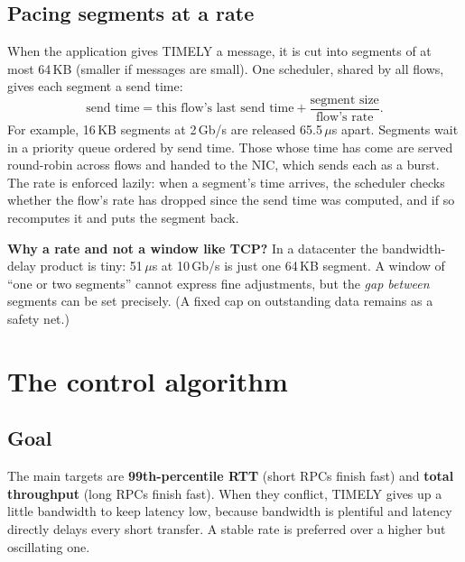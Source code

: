 \subsection{Pacing segments at a rate}
When the application gives TIMELY a message, it is cut into segments of at most 64\,KB (smaller if messages are small). One scheduler, shared by
all flows, gives each segment a send time:
\[
  \text{send time} = \text{this flow's last send time} + \frac{\text{segment size}}{\text{flow's rate}}.
\]
For example, 16\,KB segments at 2\,Gb/s are released 65.5\,$\mu$s apart. Segments wait in a priority queue ordered by send time. Those whose
time has come are served round-robin across flows and handed to the NIC, which sends each as a burst. The rate is enforced lazily: when a
segment's time arrives, the scheduler checks whether the flow's rate has dropped since the send time was computed, and if so recomputes it and
puts the segment back.

\textbf{Why a rate and not a window like TCP?} In a datacenter the bandwidth-delay product is tiny: 51\,$\mu$s at 10\,Gb/s is just one 64\,KB
segment. A window of ``one or two segments'' cannot express fine adjustments, but the \emph{gap between} segments can be set precisely. (A
fixed cap on outstanding data remains as a safety net.)

\section{The control algorithm}

\subsection{Goal}
The main targets are \textbf{99th-percentile RTT} (short RPCs finish fast) and \textbf{total throughput} (long RPCs finish fast). When
they conflict, TIMELY gives up a little bandwidth to keep latency low, because bandwidth is plentiful and latency directly delays every short
transfer. A stable rate is preferred over a higher but oscillating one.

